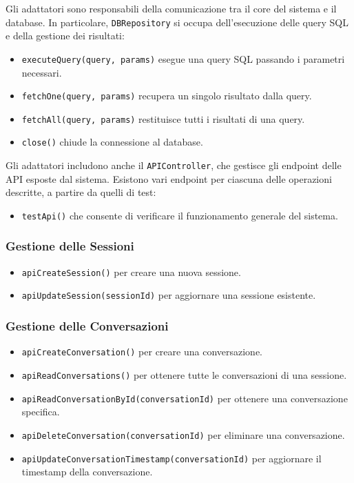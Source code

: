 Gli adattatori sono responsabili della comunicazione tra il core del sistema e il database. In particolare, \texttt{DBRepository} si occupa dell'esecuzione delle query SQL e della gestione dei risultati:
\begin{itemize}
    \item \texttt{executeQuery(query, params)} esegue una query SQL passando i parametri necessari.
    \item \texttt{fetchOne(query, params)} recupera un singolo risultato dalla query.
    \item \texttt{fetchAll(query, params)} restituisce tutti i risultati di una query.
    \item \texttt{close()} chiude la connessione al database.
\end{itemize}

Gli adattatori includono anche il \texttt{APIController}, che gestisce gli endpoint delle API esposte dal sistema. Esistono vari endpoint per ciascuna delle operazioni descritte, a partire da quelli di test:
\begin{itemize}
    \item \texttt{testApi()} che consente di verificare il funzionamento generale del sistema.
\end{itemize}

\subsubsection*{Gestione delle Sessioni}
\begin{itemize}
    \item \texttt{apiCreateSession()} per creare una nuova sessione.
    \item \texttt{apiUpdateSession(sessionId)} per aggiornare una sessione esistente.
\end{itemize}

\subsubsection*{Gestione delle Conversazioni}
\begin{itemize}
    \item \texttt{apiCreateConversation()} per creare una conversazione.
    \item \texttt{apiReadConversations()} per ottenere tutte le conversazioni di una sessione.
    \item \texttt{apiReadConversationById(conversationId)} per ottenere una conversazione specifica.
    \item \texttt{apiDeleteConversation(conversationId)} per eliminare una conversazione.
    \item \texttt{apiUpdateConversationTimestamp(conversationId)} per aggiornare il timestamp della conversazione.
\end{itemize}

